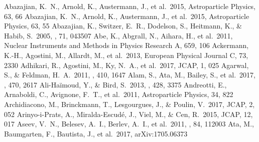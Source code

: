 \documentclass{emulateapj}
\begin{document}
\begin{thebibliography}{}

 Abazajian, K.~N., Arnold, K., Austermann, J., et al.\ 2015, Astroparticle Physics, 63, 66
 Abazajian, K.~N., Arnold, K., Austermann, J., et al.\ 2015, Astroparticle Physics, 63, 55
 Abazajian, K., Switzer, E.~R., Dodelson, S., Heitmann, K., \& Habib, S.\ 2005, \prd, 71, 043507  
 Abe, K., Abgrall, N., Aihara, H., et al.\ 2011, Nuclear Instruments and Methods in Physics Research A, 659, 106 
 Ackermann, K.-H., Agostini, M., Allardt, M., et al.\ 2013, European Physical Journal C, 73, 2330 
 Adhikari, R., Agostini, M., Ky, N.~A., et al.\ 2017, JCAP, 1, 025 
 Agarwal, S., \& Feldman, H.~A.\ 2011, \mnras, 410, 1647 
 Alam, S., Ata, M., Bailey, S., et al.\ 2017, \mnras, 470, 2617 
 Ali-Ha{\"i}moud, Y., \& Bird, S.\ 2013, \mnras, 428, 3375
 Andreotti, E., Arnaboldi, C., Avignone, F.~T., et al.\ 2011, Astroparticle Physics, 34, 822 
 Archidiacono, M., Brinckmann, T., Lesgourgues, J., \& Poulin, V.\ 2017, JCAP, 2, 052
 Arinyo-i-Prats, A., Miralda-Escud{\'e}, J., Viel, M., \& Cen, R.\ 2015, JCAP, 12, 017 
 Aseev, V.~N., Belesev, A.~I., Berlev, A.~I., et al.\ 2011, \prd, 84, 112003 
 Ata, M., Baumgarten, F., Bautista, J., et al.\ 2017, arXiv:1705.06373 


\end{thebibliography}
\end{document}
